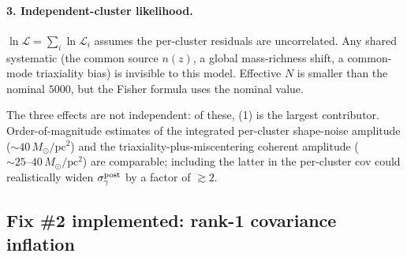 \documentclass[11pt,a4paper]{article}
\begin{document}
\paragraph{3. Independent-cluster likelihood.}
$\ln\mathcal{L}=\sum_i\ln\mathcal{L}_i$ assumes the per-cluster residuals
are uncorrelated.  Any shared systematic (the common source $n(z)$, a
global mass-richness shift, a common-mode triaxiality bias) is invisible
to this model.  Effective $N$ is smaller than the nominal $5000$, but the
Fisher formula uses the nominal value.

The three effects are not independent: of these, (1) is the largest
contributor.  Order-of-magnitude estimates of the integrated per-cluster
shape-noise amplitude ($\sim\!40\,M_\odot/\mathrm{pc}^2$) and the
triaxiality-plus-miscentering coherent amplitude
($\sim\!25\text{--}40\,M_\odot/\mathrm{pc}^2$) are comparable; including
the latter in the per-cluster cov could realistically widen
$\sigma_\gamma^{\rm post}$ by a factor of $\gtrsim\!2$.

\subsection{Fix \#2 implemented: rank-1 covariance inflation}
\label{sec:rank1}
\end{document}
